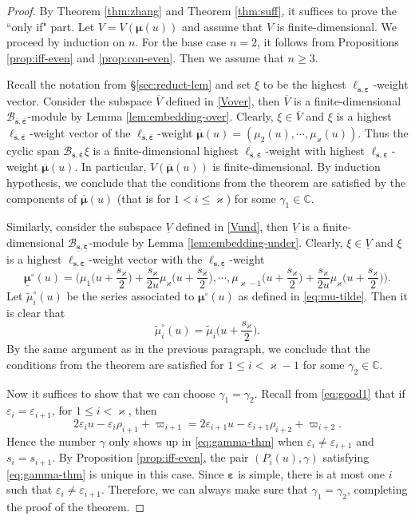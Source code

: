 \documentclass[11pt,reqno]{amsart}
\numberwithin{equation}{section}
\theoremstyle{definition}
\theoremstyle{remark}
\newcommand{\bC}{\mathbb{C}}
\newcommand{\tl}{\tilde}
\newcommand{\gge}{\geqslant}
\newcommand{\lle}{\leqslant}
\newcommand{\ka}{\varkappa}
\newcommand{\ve}{\varepsilon}
\newcommand{\s}{{\bm s}}
\newcommand{\ovs}{{\overline{\bm s}}}
\newcommand{\ove}{{\overline{\bm \varepsilon}}}
\newcommand{\uns}{{\underline{\bm s}}}
\newcommand{\une}{{\underline{\bm \varepsilon}}}
\begin{document}
\begin{proof} 
By Theorem \ref{thm:zhang} and Theorem \ref{thm:suff}, it suffices to prove the ``only if" part. Let $V=V(\bm\mu(u))$ and assume that $V$ is finite-dimensional. We proceed by induction on $n$. For the base case $n=2$, it follows from Propositions \ref{prop:iff-even} and \ref{prop:con-even}. Then we assume that $n\gge 3$.

Recall the notation from \S \ref{sec:reduct-lem} and set $\xi$ to be the highest $\ell_{\s,\bm\ve}$-weight vector. Consider the subspace $\overline V$ defined in \eqref{Vover}, then $\overline V$ is a finite-dimensional $\mathscr B_{\ovs,\ove}$-module by Lemma \ref{lem:embedding-over}. Clearly, $\xi\in\overline V$ and $\xi$ is a highest $\ell_{\ovs,\ove}$-weight vector of the $\ell_{\ovs,\ove}$-weight $\overline{\bm\mu}(u)=(\mu_2(u),\cdots,\mu_\ka(u))$. Thus the cyclic span $\mathscr B_{\ovs,\ove}\xi$ is a finite-dimensional highest $\ell_{\ovs,\ove}$-weight with highest $\ell_{\ovs,\ove}$-weight $\overline{\bm\mu}(u)$. In particular, $V(\overline{\bm\mu}(u))$ is finite-dimensional. By induction hypothesis, we conclude that the conditions from the theorem are satisfied by the components of $\overline{\bm\mu}(u)$ (that is for $1<i\lle\ka$) for some $\gamma_1\in\bC$.

Similarly, consider the subspace $\underline{V}$ defined in \eqref{Vund}, then $\underline V$ is a finite-dimensional $\mathscr B_{\uns,\une}$-module by Lemma \ref{lem:embedding-under}. Clearly, $\xi\in\underline V$ and $\xi$ is a highest $\ell_{\uns,\une}$-weight vector with the $\ell_{\uns,\une}$-weight
\[
\underline{\bm\mu}^\circ(u)=\Big(\mu_1\Big(u+\frac{s_\ka}{2}\Big)+\frac{s_\ka}{2u}\mu_{\ka}\Big(u+\frac{s_\ka}{2}\Big),\cdots,\mu_{\ka-1}\Big(u+\frac{s_\ka}{2}\Big)+\frac{s_\ka}{2u}\mu_{\ka}\Big(u+\frac{s_\ka}{2}\Big)\Big).
\]
Let $\tl{\mu}_i^\circ(u)$ be the series associated to $\bm\mu^\circ(u)$ as defined in \eqref{eq:mu-tilde}. Then it is clear that
\[
\tl{\mu}_i^\circ(u)=\tl{\mu}_i\Big(u+\frac{s_\ka}{2}\Big).
\]
By the same argument as in the previous paragraph, we conclude that the conditions from the theorem are satisfied for $1\lle i<\ka-1$ for some $\gamma_2\in\bC$.

Now it suffices to show that we can choose $\gamma_1=\gamma_2$. Recall from \eqref{eq:good1} that if $\ve_i=\ve_{i+1}$, for $1\lle i<\ka$, then
$$
2\ve_i u-\ve_i\rho_{i+1}+\varpi_{i+1}=2\ve_{i+1} u-\ve_{i+1}\rho_{i+2}+\varpi_{i+2}.
$$
Hence the number $\gamma$ only shows up in \eqref{eq:gamma-thm} when $\ve_i\ne \ve_{i+1}$ and $s_i= s_{i+1}$. By Proposition \ref{prop:iff-even}, the pair $(P_i(u),\gamma)$ satisfying \eqref{eq:gamma-thm} is unique in this case. Since $\bm\ve$ is simple, there is at most one $i$ such that $\ve_i\ne \ve_{i+1}$. Therefore, we can always make sure that $\gamma_1=\gamma_2$, completing the proof of the theorem.
\end{proof}
\end{document}
